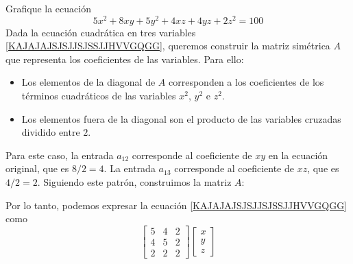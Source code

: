 \begin{example}
    Grafique la ecuación
    \begin{equation}
        5x^2 + 8xy + 5y^2 + 4xz + 4yz + 2z^2 = 100 \label{KAJAJAJSJSJJSJSSJJHVVGQGG}
    \end{equation}
    \solucion Dada la ecuación cuadrática en tres variables \eqref{KAJAJAJSJSJJSJSSJJHVVGQGG}, queremos construir la matriz simétrica $A$ que representa los coeficientes de las variables. Para ello:
    \begin{itemize}
        \item Los elementos de la diagonal de $A$ corresponden a los coeficientes de los términos cuadráticos de las variables $x^2$, $y^2$ e $z^2$.
        \item Los elementos fuera de la diagonal son el producto de las variables cruzadas dividido entre $2$.
    \end{itemize}
    Para este caso, la entrada $a_{12}$ corresponde al coeficiente de $xy$ en la ecuación original, que es $8/2 = 4$. La entrada $a_{13}$ corresponde al coeficiente de $xz$, que es $4/2 = 2$. Siguiendo este patrón, construimos la matriz $A$:
    \begin{nscenter}
    \end{nscenter}
    Por lo tanto, podemos expresar la ecuación \eqref{KAJAJAJSJSJJSJSSJJHVVGQGG} como
    $$\begin{bmatrix}
        5 & 4 & 2 \\
        4 & 5 & 2 \\
        2 & 2 & 2
    \end{bmatrix} \begin{bmatrix}
        x \\
        y \\
        z

\end{bmatrix}$$
\end{example}
